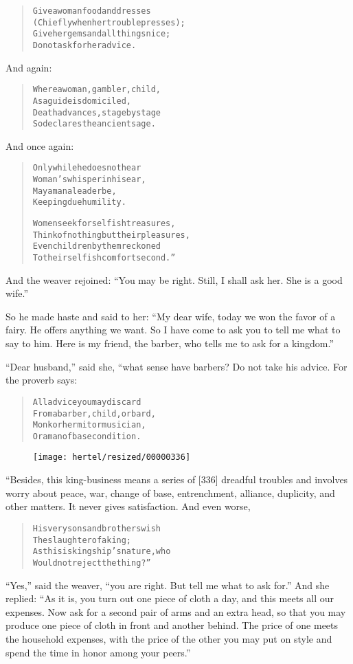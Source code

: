 \documentclass[article, twoside, 10pt]{memoir}
\renewenvironment{verbatim}{%
\begin{quote}%
\vskip -10pt%
\begin{alltt}\normalfont\small}{\end{alltt}%
\end{quote}%
\vskip -10pt
} %
\begin{document}
\begin{verbatim}
Give a woman food and dresses
(Chiefly when her trouble presses);
Give her gems and all things nice;
Do not ask for her advice.
\end{verbatim}
And again:

\begin{verbatim}
Where a woman, gambler, child,
As a guide is domiciled,
Death advances, stage by stage{\textemdash}
So declares the ancient sage.
\end{verbatim}
And once again:

\begin{verbatim}
Only while he does not hear
Woman's whisper in his ear,
May a man a leader be,
Keeping due humility.

Women seek for selfish treasures,
Think of nothing but their pleasures,
Even children by them reckoned
To their selfish comfort second.”
\end{verbatim}
And the weaver rejoined:
``You may be right. Still, I shall ask her. She is a good wife.''

So he made haste and said to her:
``My dear wife, today we won the favor of a fairy. He offers anything we want. So I have come to ask you to tell me what to say to him. Here is my friend, the barber, who tells me to ask for a kingdom.''

``Dear husband,'' said she, “what sense have barbers? Do not take
his advice. For the proverb says:

\begin{verbatim}
All advice you may discard
From a barber, child, or bard,
Monk or hermit or musician,
Or a man of base condition.
\end{verbatim}
\begin{figure}[p]\texttt{[image: hertel/resized/00000336]}\end{figure}“Besides, this king-business means a series of [336] dreadful
troubles and involves worry about peace, war, change of base,
entrenchment, alliance, duplicity, and other matters. It never
gives satisfaction. And even worse,

\begin{verbatim}
His very sons and brothers wish
    The slaughter of a king;
As this is kingship's nature, who
    Would not reject the thing?”
\end{verbatim}
``Yes,'' said the weaver,
``you are right. But tell me what to ask for.'' And she replied:
``As it is, you turn out one piece of cloth a day, and this meets all our expenses. Now ask for a second pair of arms and an extra head, so that you may produce one piece of cloth in front and another behind. The price of one meets the household expenses, with the price of the other you may put on style and spend the time in honor among your peers.''
\end{document}
